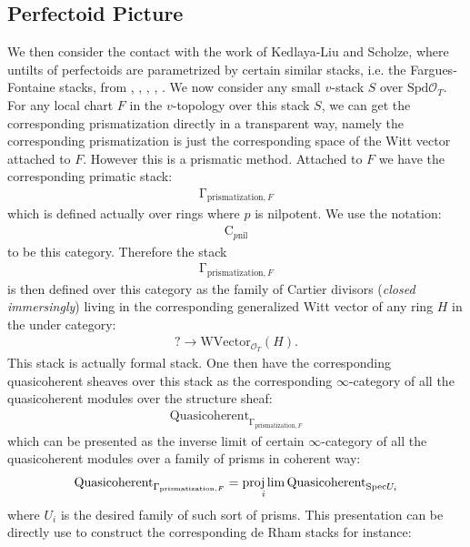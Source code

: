 \documentclass[12pt]{article}
\theoremstyle{definition}
\begin{document}
\subsection{Perfectoid Picture}
\noindent We then consider the contact with the work of Kedlaya-Liu and Scholze, where untilts of perfectoids are parametrized by certain similar stacks, i.e. the Fargues-Fontaine stacks, from \cite{KLI}, \cite{KLII}, \cite{SchII}, \cite{SchIII}, \cite{SchIV}. We now consider any small $v$-stack $S$ over $\mathrm{Spd}\mathcal{O}_T$. For any local chart ${F}$ in the $v$-topology over this stack $S$, we can get the corresponding prismatization directly in a transparent way, namely the corresponding prismatization is just the corresponding space of the Witt vector attached to $F$. However this is a prismatic method. Attached to $F$ we have the corresponding primatic stack:
\begin{align}
\mathrm{\Gamma}_{\mathrm{prismatization},F}
\end{align}  
which is defined actually over rings where $p$ is nilpotent. We use the notation:
\begin{align}
\mathrm{C}_{p\mathrm{nil}} 
\end{align}
to be this category. Therefore the stack
\begin{align}
\mathrm{\Gamma}_{\mathrm{prismatization},F}
\end{align} 
is then defined over this category as the family of Cartier divisors (\textit{closed immersingly}) living in the corresponding generalized Witt vector of any ring $H$ in the under category:
\begin{align}
?\rightarrow \mathrm{WVector}_{\mathcal{O}_T}(H).
\end{align}
This stack is actually formal stack. One then have the corresponding quasicoherent sheaves over this stack as the corresponding $\infty$-category of all the quasicoherent modules over the structure sheaf:
\begin{align}
\mathrm{Quasicoherent}_{\mathrm{\Gamma}_{\mathrm{prismatization},F}}
\end{align}
which can be presented as the inverse limit of certain $\infty$-category of all the quasicoherent modules over a family of prisms in coherent way:
\begin{align}
\mathrm{Quasicoherent}_{\mathrm{\Gamma}_{\mathrm{prismatization},F}}=\projlim_i \mathrm{Quasicoherent}_{\mathrm{Spec}U_i}
\end{align}
where $U_i$ is the desired family of such sort of prisms. This presentation can be directly use to construct the corresponding de Rham stacks for instance:
\end{document}
